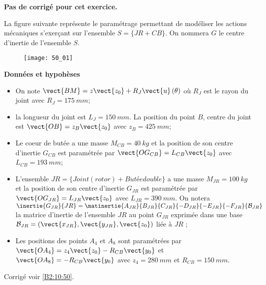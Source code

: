 \normaltrue \difficilefalse \tdifficilefalse
\correctionfalse


\setcounter{numques}{0}
\ifcorrection
\else
\textbf{Pas de corrigé pour cet exercice.}
\fi




\ifprof
\else
La figure suivante représente le paramétrage permettant de modéliser les actions mécaniques
s’exerçant sur l’ensemble $S=\{JR+CB\}$. On nommera $G$ le centre d’inertie de l’ensemble
$S$.


\begin{figure}[H]
\centering
\texttt{[image: 50\_01]}
\end{figure}
\fi

\textbf{Données et hypohèses}

\begin{itemize}
\item On note $\vect{BM}=z\vect{z_0}+R_J\vect{u}\left(\theta\right)$ où $R_J$ est le rayon du joint avec $R_J = \SI{175}{mm}$;
\item la longueur du joint est $L_J = \SI{150}{mm}$. La position du point $B$, centre du joint est $\vect{OB}=z_B\vect{z_0}$ avec $z_B = \SI{425}{mm}$;
\item Le coeur de butée a une masse $M_{CB} = \SI{40}{kg}$ et la position de son centre d’inertie $G_{CB}$ est paramétrée par $\vect{OG_{CB}}= L_{CB}\vect{z_0}$ avec $L_{CB} = \SI{193}{mm}$;
\item L’ensemble $JR=\{Joint(rotor)+ Butée double\}$ a une masse $M_{JR} = \SI{100}{kg}$ et la
position de son centre d’inertie $G_{JR}$ est paramétrée par $\vect{OG_{JR}}=L_{JR}\vect{z_0}$ avec $L_{JR}=
\SI{390}{mm}$. On notera $\inertie{G_{JR}}{JR} = \matinertie{A_{JR}}{B_{JR}}{C_{JR}}{-D_{JR}}{-E_{JR}}{-F_{JR}}{\mathcal{B}_{JR}}$ la matrice d’inertie de l’ensemble $JR$ au point $G_{JR}$ exprimée dans une base $\mathcal{B}_{JR} = \left(\vect{x_{JR}},\vect{y_{JR}},\vect{z_{0}}\right)$ liée à $JR$ ;
\item Les positions des points $A_4$ et $A_8$ sont paramétrées par $\vect{OA_4} = z_4\vect{z_0}-R_{CB}\vect{y_0}$ et
$\vect{OA_8}=-R_{CB}\vect{y_0}$ avec $z_4 = \SI{280}{mm}$ et $R_{CB}=\SI{150}{mm}$.
\end{itemize}

\ifprof
\else
\fi


\ifprof
\else
\fi



\ifprof
\else
\begin{flushright}
\footnotesize{Corrigé voir \ref{B2:10:50}.}
\end{flushright}%
\fi